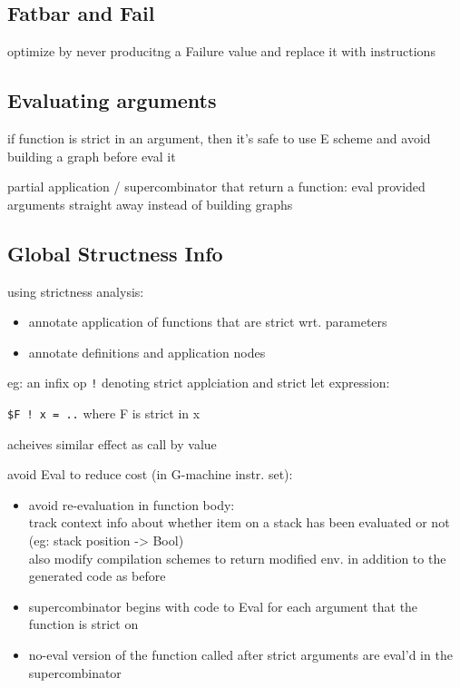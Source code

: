 \documentclass[8pt]{extarticle}
\begin{document}
\begin{multicols*}{2}
\subsection{Fatbar and Fail}
optimize by never producitng a Failure value and replace it with instructions

\subsection{Evaluating arguments}

if function is strict in an argument, then it's safe to use E scheme and avoid building a graph before eval it

partial application / supercombinator that return a function: eval provided arguments straight away instead of building graphs

\subsection{Global Structness Info}

using strictness analysis:
\begin{itemize}
\item annotate application of functions that are strict wrt. parameters
\item annotate definitions and application nodes
\end{itemize}

eg: an infix op \verb|!| denoting strict applciation and strict let expression:

\verb|$F ! x = ..| where F is strict in x

acheives similar effect as call by value

avoid Eval to reduce cost (in G-machine instr. set):
\begin{itemize}
\item avoid re-evaluation in function body:\\
  track context info about whether item on a stack has been evaluated or not (eg: stack position -> Bool)\\
  also modify compilation schemes to return modified env. in addition to the generated code as before
\item supercombinator begins with code to Eval for each argument that the function is strict on
\item no-eval version of the function called after strict arguments are eval'd in the supercombinator 
\end{itemize}


\end{multicols*}
\end{document}
